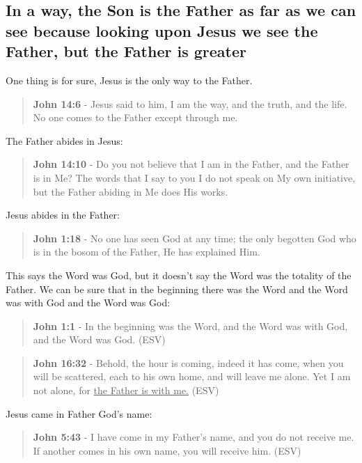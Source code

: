 \documentclass[11pt]{article}
\begin{document}
\subsection{In a way, the Son is the Father as far as we can see because looking upon Jesus we see the Father, but the Father is greater}
\label{sec:org96fc36a}

One thing is for sure, Jesus is the only way to the Father.

\begin{quote}
\textbf{John 14:6} - Jesus said to him, I am the way, and the truth, and the life. No one comes to the Father except through me.
\end{quote}

The Father abides in Jesus:

\begin{quote}
\textbf{John 14:10} - Do you not believe that I am in the Father, and the Father is in Me? The words that I say to you I do not speak on My own initiative, but the Father abiding in Me does His works.
\end{quote}

Jesus abides in the Father:

\begin{quote}
\textbf{John 1:18} - No one has seen God at any time; the only begotten God who is in the bosom of the Father, He has explained Him.
\end{quote}

This says the Word was God, but it doesn't say the Word was the totality of the Father. We can be sure that in the beginning there was the Word and the Word was with God and the Word was God:

\begin{quote}
\textbf{John 1:1} - In the beginning was the Word, and the Word was with God, and the Word was God. (ESV)
\end{quote}

\begin{quote}
\textbf{John 16:32} - Behold, the hour is coming, indeed it has come, when you will be scattered, each to his own home, and will leave me alone. Yet I am not alone, for \uline{the Father is with me.} (ESV)
\end{quote}

Jesus came in Father God's name:

\begin{quote}
\textbf{John 5:43} - I have come in my Father's name, and you do not receive me. If another comes in his own name, you will receive him. (ESV)
\end{quote}
\end{document}
